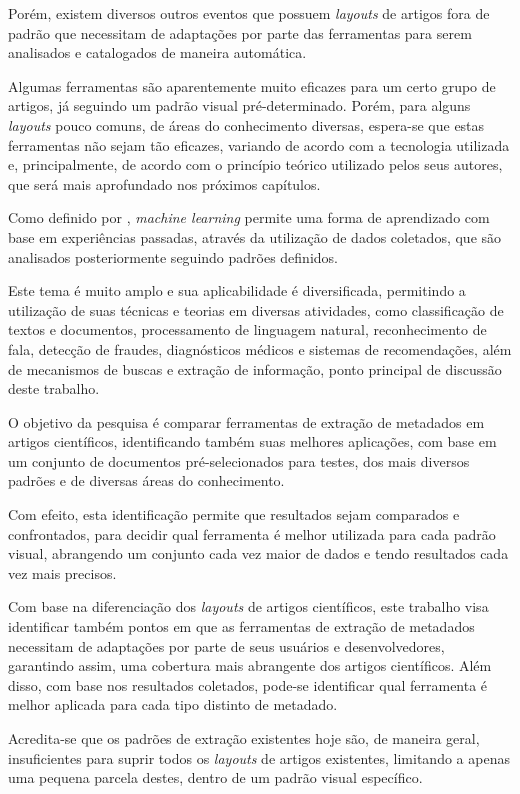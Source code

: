 Porém, existem diversos outros eventos que possuem \textit{layouts} de artigos fora de padrão que necessitam de adaptações por parte das ferramentas para serem analisados e catalogados de maneira automática. 

Algumas ferramentas são aparentemente muito eficazes para um certo grupo de artigos, já seguindo um padrão visual pré-determinado. Porém, para alguns \textit{layouts} pouco comuns, de áreas do conhecimento diversas, espera-se que estas ferramentas não sejam tão eficazes, variando de acordo com a tecnologia utilizada e, principalmente, de acordo com o princípio teórico utilizado pelos seus autores, que será mais aprofundado nos próximos capítulos.

Como definido por \cite{foundations-machine-learning}, \textit{machine learning} permite uma forma de aprendizado com base em experiências passadas, através da utilização de dados coletados, que são analisados posteriormente seguindo padrões definidos.

Este tema é muito amplo e sua aplicabilidade é diversificada, permitindo a utilização de suas técnicas e teorias em diversas atividades, como classificação de textos e documentos, processamento de linguagem natural, reconhecimento de fala, detecção de fraudes, diagnósticos médicos e sistemas de recomendações, além de mecanismos de buscas e extração de informação, ponto principal de discussão deste trabalho.

O objetivo da pesquisa é comparar ferramentas de extração de metadados em artigos científicos, identificando também suas melhores aplicações, com base em um conjunto de documentos pré-selecionados para testes, dos mais diversos padrões e de diversas áreas do conhecimento.

Com efeito, esta identificação permite que resultados sejam comparados e confrontados, para decidir qual ferramenta é melhor utilizada para cada padrão visual, abrangendo um conjunto cada vez maior de dados e tendo resultados cada vez mais precisos.

Com base na diferenciação dos \textit{layouts} de artigos científicos, este trabalho visa identificar também pontos em que as ferramentas de extração de metadados necessitam de adaptações por parte de seus usuários e desenvolvedores, garantindo assim, uma cobertura mais abrangente dos artigos científicos. Além disso, com base nos resultados coletados, pode-se identificar qual ferramenta é melhor aplicada para cada tipo distinto de metadado.

Acredita-se que os padrões de extração existentes hoje são, de maneira geral, insuficientes para suprir todos os \emph{layouts} de artigos existentes, limitando a apenas uma pequena parcela destes, dentro de um padrão visual específico.

